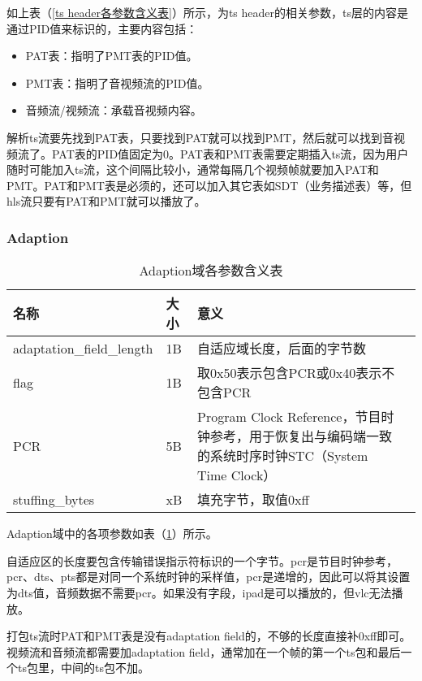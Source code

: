 \documentclass[bachelor]{thesis-uestc}
\begin{document}
如上表（\ref{ts header各参数含义表}）所示，为ts header的相关参数，ts层的内容是通过PID值来标识的，主要内容包括：
\begin{itemize}
	\item PAT表：指明了PMT表的PID值。
	\item PMT表：指明了音视频流的PID值。
	\item 音频流/视频流：承载音视频内容。
\end{itemize}


解析ts流要先找到PAT表，只要找到PAT就可以找到PMT，然后就可以找到音视频流了。PAT表的PID值固定为0。PAT表和PMT表需要定期插入ts流，因为用户随时可能加入ts流，这个间隔比较小，通常每隔几个视频帧就要加入PAT和PMT。PAT和PMT表是必须的，还可以加入其它表如SDT（业务描述表）等，但hls流只要有PAT和PMT就可以播放了。

\subsubsection{Adaption}

\begin{table}[!h]
\centering
\caption{Adaption域各参数含义表}
\label{Adaption域各参数含义表}
\begin{tabular}{lp{3cm}p{6cm}p{2cm}}
\toprule
名称	&  大小 & 意义 \\
\midrule

adaptation\_field\_length	& 1B	& 自适应域长度，后面的字节数\\
flag	& 1B& 	取0x50表示包含PCR或0x40表示不包含PCR\\
PCR	& 5B & 	Program Clock Reference，节目时钟参考，用于恢复出与编码端一致的系统时序时钟STC（System Time Clock）\\
stuffing\_bytes	& xB & 	填充字节，取值0xff\\
\bottomrule 
\end{tabular}
\end{table}


\par Adaption域中的各项参数如表（\ref{Adaption域各参数含义表}）所示。

\par 自适应区的长度要包含传输错误指示符标识的一个字节。pcr是节目时钟参考，pcr、dts、pts都是对同一个系统时钟的采样值，pcr是递增的，因此可以将其设置为dts值，音频数据不需要pcr。如果没有字段，ipad是可以播放的，但vlc无法播放。

\par 打包ts流时PAT和PMT表是没有adaptation field的，不够的长度直接补0xff即可。视频流和音频流都需要加adaptation field，通常加在一个帧的第一个ts包和最后一个ts包里，中间的ts包不加。
     
\end{document}
